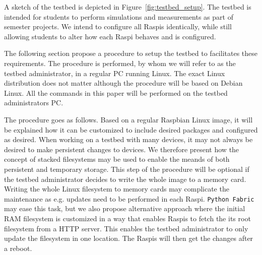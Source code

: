 A sketch of the testbed is depicted in Figure~\ref{fig:testbed_setup}.
The testbed is intended for students to perform simulations and measurements
as part of semester projects. We intend to configure all
\ac{Raspi}s identically, while still allowing students to alter how each
\ac{Raspi} behaves and is configured.

The following section propose a procedure to setup the testbed to facilitates these
requirements. The procedure is performed, by whom we will refer
to as the testbed administrator, in a regular \ac{PC} running Linux. The exact Linux
distribution does not matter although the procedure will be based on
Debian Linux. All the commands in this paper will be performed on
the testbed administrators \ac{PC}.

The procedure goes as follows. Based on a regular Raspbian Linux image, it will
be explained how it can be customized to include desired packages and
configured as desired.
When working on a testbed with many devices, it may not always be desired to make
persistent changes to devices. We therefore present how the concept of stacked
filesystems may be used to enable the meands of both persistent and temporary
storage. This step of the procedure will be optional if the testbed
administrator decides to write the whole image to a memory card.
Writing the whole Linux filesystem to memory cards may complicate the
maintenance as e.g. updates need to be performed in each \ac{Raspi}.
\texttt{Python Fabric} may ease this task, but we also propose alternative
approach where the initial \ac{RAM} filesystem is customized in a way that
enables \ac{Raspi}s to fetch the its root filesystem from a \ac{HTTP}
server. This enables the testbed administrator to only update the filesystem
in one location. The \ac{Raspi}s will then get the changes after a reboot.









